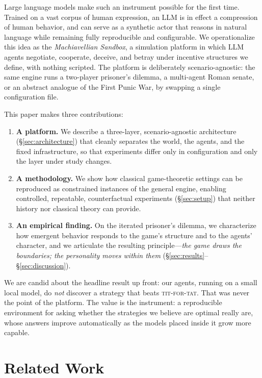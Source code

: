 Large language models make such an instrument possible for the first time. Trained on a vast corpus of human expression, an LLM is in effect a compression of human behavior, and can serve as a synthetic actor that reasons in natural language while remaining fully reproducible and configurable. We operationalize this idea as the \emph{Machiavellian Sandbox}, a simulation platform in which LLM agents negotiate, cooperate, deceive, and betray under incentive structures we define, with nothing scripted. The platform is deliberately scenario-agnostic: the same engine runs a two-player prisoner's dilemma, a multi-agent Roman senate, or an abstract analogue of the First Punic War, by swapping a single configuration file.

This paper makes three contributions:
\begin{enumerate}
  \item \textbf{A platform.} We describe a three-layer, scenario-agnostic architecture (\S\ref{sec:architecture}) that cleanly separates the world, the agents, and the fixed infrastructure, so that experiments differ only in configuration and only the layer under study changes.
  \item \textbf{A methodology.} We show how classical game-theoretic settings can be reproduced as constrained instances of the general engine, enabling controlled, repeatable, counterfactual experiments (\S\ref{sec:setup}) that neither history nor classical theory can provide.
  \item \textbf{An empirical finding.} On the iterated prisoner's dilemma, we characterize how emergent behavior responds to the game's structure and to the agents' character, and we articulate the resulting principle---\emph{the game draws the boundaries; the personality moves within them} (\S\ref{sec:results}--\S\ref{sec:discussion}).
\end{enumerate}

We are candid about the headline result up front: our agents, running on a small local model, do \emph{not} discover a strategy that beats \textsc{tit-for-tat}. That was never the point of the platform. The value is the instrument: a reproducible environment for asking whether the strategies we believe are optimal really are, whose answers improve automatically as the models placed inside it grow more capable.

\section{Related Work}
\label{sec:related}

